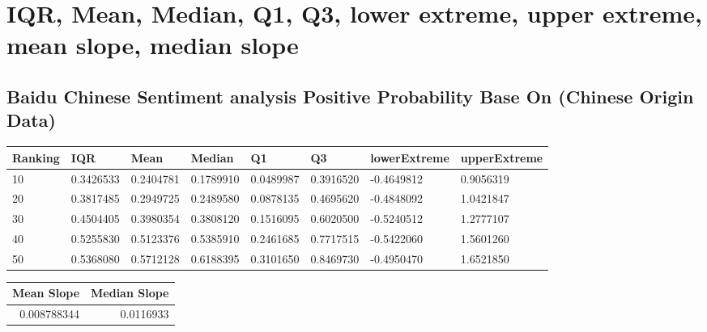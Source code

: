\documentclass[conference]{IEEEtran}
\begin{document}
\section{IQR, Mean, Median, Q1, Q3, lower extreme, upper extreme, mean slope, median slope}
\subsection{Baidu Chinese Sentiment analysis Positive Probability Base On (Chinese Origin Data)}
\begin{tabularx}{\textwidth}{ |X|X|X|X|X|X|X|X }
Ranking & IQR & Mean & Median & Q1 & Q3 & lowerExtreme & upperExtreme\\
\hline
10 & 0.3426533 & 0.2404781 & 0.1789910 & 0.0489987 & 0.3916520 & -0.4649812 & 0.9056319\\
20 & 0.3817485 & 0.2949725 & 0.2489580 & 0.0878135 & 0.4695620 & -0.4848092 & 1.0421847\\
30 & 0.4504405 & 0.3980354 & 0.3808120 & 0.1516095 & 0.6020500 & -0.5240512 & 1.2777107\\
40 & 0.5255830 & 0.5123376 & 0.5385910 & 0.2461685 & 0.7717515 & -0.5422060 & 1.5601260\\
50 & 0.5368080 & 0.5712128 & 0.6188395 & 0.3101650 & 0.8469730 & -0.4950470 & 1.6521850\\
\end{tabularx}


\begin{tabular}{rr}
  \hline
  Mean Slope & Median Slope \\
  \hline
  0.008788344 & 0.0116933 \\
  \hline
\end{tabular}




\end{document}
